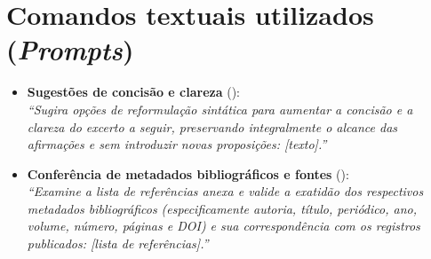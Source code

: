\section*{Comandos textuais utilizados (\textit{Prompts})}
\begin{itemize}
  \item \textbf{Sugestões de concisão e clareza} ():\\
        \textit{``Sugira opções de reformulação sintática para aumentar a concisão e a clareza do excerto a seguir, preservando integralmente o alcance das afirmações e sem introduzir novas proposições: [texto].''}

  \item \textbf{Conferência de metadados bibliográficos e fontes} ():\\
        \textit{``Examine a lista de referências anexa e valide a exatidão dos respectivos metadados bibliográficos (especificamente autoria, título, periódico, ano, volume, número, páginas e DOI) e sua correspondência com os registros publicados: [lista de referências].''}
\end{itemize}
